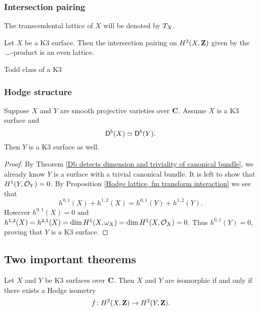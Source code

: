 \subsubsection{Intersection pairing}

The transcendental lattice of $X$ will be denoted by $T_{X}$.

\begin{proposition}
    \label{intersection pairing on K3 is even}
    Let $X$ be a K3 surface. Then the intersection pairing on $H^2(X, \mathbf Z)$ given by the $\smallsmile$-product is an even lattice. 
\end{proposition}

\begin{proposition}
    \label{Todd class of K3}
    Todd class of a K3
\end{proposition}

\begin{example}
    
\end{example}

\subsubsection{Hodge structure}

\begin{theorem}
    Suppose $X$ and $Y$ are smooth projective varieties over $\mathbf C$. Assume $X$ is a K3 surface and
    \[
        \mathsf{D}^b(X) \simeq \mathsf{D}^b(Y).
    \]
    Then $Y$ is a K3 surface as well. 
\end{theorem}

\begin{proof}
    By Theorem \ref{Db detects dimension and triviality of canonical bundle}, we already know $Y$ is a surface with a trivial canonical bundle. It is left to show that $H^{1}(Y, {\mathcal{O}_{Y}}) = 0$. By Proposition \ref{Hodge lattice, fm transform interaction} we see that 
    \[
        h^{0,1}(X) + h^{1,2}(X) = h^{0,1}(Y) + h^{1,2}(Y). 
    \]
    However $h^{0,1}(X) = 0$ and $h^{1,2}(X) = h^{2,1}(X) = \dim H^{1}(X, \omega_X) = \dim H^{1}(X, {\mathcal{O}_{X}}) = 0$. Thus $h^{0,1}(Y) = 0$, proving that $Y$ is a K3 surface.
\end{proof}

\subsection{Two important theorems}

\cite[\S 7, Theorem 5.3]{Huybrechts2016}

\begin{theorem}
    \label{Classical Torelli theorem}
    Let $X$ and $Y$ be K3 surfaces over $\mathbf C$. Then $X$ and $Y$ are isomorphic if and only if there exists a Hodge isometry
    \[
        f\colon H^{2}(X, \mathbf Z) \to H^{2}(Y, \mathbf Z).
    \]
\end{theorem}




